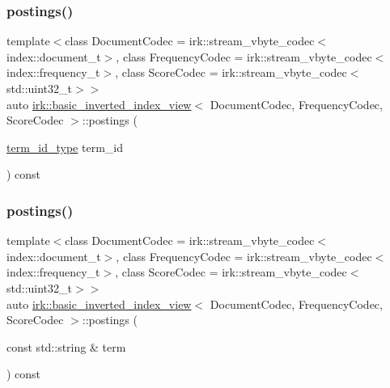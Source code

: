 \subsubsection{\texorpdfstring{postings()}{postings()}\hspace{0.1cm}{\footnotesize\ttfamily [1/2]}}
{\footnotesize\ttfamily template$<$class Document\+Codec  = irk\+::stream\+\_\+vbyte\+\_\+codec$<$index\+::document\+\_\+t$>$, class Frequency\+Codec  = irk\+::stream\+\_\+vbyte\+\_\+codec$<$index\+::frequency\+\_\+t$>$, class Score\+Codec  = irk\+::stream\+\_\+vbyte\+\_\+codec$<$std\+::uint32\+\_\+t$>$$>$ \\
auto \mbox{\hyperlink{classirk_1_1basic__inverted__index__view}{irk\+::basic\+\_\+inverted\+\_\+index\+\_\+view}}$<$ Document\+Codec, Frequency\+Codec, Score\+Codec $>$\+::postings (\begin{DoxyParamCaption}\item[{\mbox{\hyperlink{classirk_1_1basic__inverted__index__view_a6b272abc76df208ce59bac93810e7331}{term\+\_\+id\+\_\+type}}}]{term\+\_\+id }\end{DoxyParamCaption}) const\hspace{0.3cm}{\ttfamily [inline]}}

\mbox{\label{classirk_1_1basic__inverted__index__view_a0bbf2074549e68969f3847013672910a}} 
\subsubsection{\texorpdfstring{postings()}{postings()}\hspace{0.1cm}{\footnotesize\ttfamily [2/2]}}
{\footnotesize\ttfamily template$<$class Document\+Codec  = irk\+::stream\+\_\+vbyte\+\_\+codec$<$index\+::document\+\_\+t$>$, class Frequency\+Codec  = irk\+::stream\+\_\+vbyte\+\_\+codec$<$index\+::frequency\+\_\+t$>$, class Score\+Codec  = irk\+::stream\+\_\+vbyte\+\_\+codec$<$std\+::uint32\+\_\+t$>$$>$ \\
auto \mbox{\hyperlink{classirk_1_1basic__inverted__index__view}{irk\+::basic\+\_\+inverted\+\_\+index\+\_\+view}}$<$ Document\+Codec, Frequency\+Codec, Score\+Codec $>$\+::postings (\begin{DoxyParamCaption}\item[{const std\+::string \&}]{term }\end{DoxyParamCaption}) const\hspace{0.3cm}{\ttfamily [inline]}}

